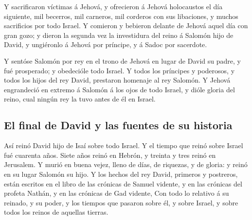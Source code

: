  Y sacrificaron víctimas á Jehová, y ofrecieron á Jehová
holocaustos el día siguiente, mil becerros, mil carneros, mil corderos
con sus libaciones, y muchos sacrificios por todo Israel.
 Y comieron y bebieron delante de Jehová aquel día con
gran gozo; y dieron la segunda vez la investidura del reino á Salomón
hijo de David, y ungiéronlo á Jehová por príncipe, y á Sadoc por
sacerdote.

 Y sentóse Salomón por rey en el trono de Jehová en lugar
de David su padre, y fué prosperado; y obedecióle todo Israel.
 Y todos los príncipes y poderosos, y todos los hijos del
rey David, prestaron homenaje al rey Salomón.  Y Jehová
engrandeció en extremo á Salomón á los ojos de todo Israel, y dióle
gloria del reino, cual ningún rey la tuvo antes de él en Israel.

\hypertarget{el-final-de-david-y-las-fuentes-de-su-historia}{%
\subsection{El final de David y las fuentes de su
historia}\label{el-final-de-david-y-las-fuentes-de-su-historia}}

 Así reinó David hijo de Isaí sobre todo Israel.
 Y el tiempo que reinó sobre Israel fué cuarenta años.
Siete años reinó en Hebrón, y treinta y tres reinó en Jerusalem.
 Y murió en buena vejez, lleno de días, de riquezas, y de
gloria: y reinó en su lugar Salomón su hijo.  Y los
hechos del rey David, primeros y postreros, están escritos en el libro
de las crónicas de Samuel vidente, y en las crónicas del profeta Nathán,
y en las crónicas de Gad vidente,  Con todo lo relativo á
su reinado, y su poder, y los tiempos que pasaron sobre él, y sobre
Israel, y sobre todos los reinos de aquellas tierras.
